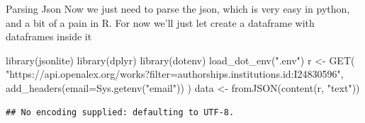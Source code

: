 \documentclass[
  10pt,
  ignorenonframetext,
  aspectratio=169]{beamer}
\newenvironment{Shaded}{\begin{snugshade}}{\end{snugshade}}
\newcommand{\AttributeTok}[1]{\textcolor[rgb]{0.80,0.80,0.80}{#1}}
\newcommand{\FunctionTok}[1]{\textcolor[rgb]{0.94,0.94,0.56}{#1}}
\newcommand{\NormalTok}[1]{\textcolor[rgb]{0.80,0.80,0.80}{#1}}
\newcommand{\OtherTok}[1]{\textcolor[rgb]{0.94,0.94,0.56}{#1}}
\newcommand{\SpecialCharTok}[1]{\textcolor[rgb]{0.86,0.64,0.64}{#1}}
\newcommand{\StringTok}[1]{\textcolor[rgb]{0.80,0.58,0.58}{#1}}
\begin{document}
\begin{frame}[fragile]{Parsing Json}
\protect\hypertarget{parsing-json-1}{}
Now we just need to parse the json, which is very easy in python, and a
bit of a pain in R. For now we'll just let create a dataframe with
dataframes inside it

\scriptsize

\begin{Shaded}
\begin{Highlighting}[]
\FunctionTok{library}\NormalTok{(jsonlite)}
\FunctionTok{library}\NormalTok{(dplyr)}
\FunctionTok{library}\NormalTok{(dotenv)}
\FunctionTok{load\_dot\_env}\NormalTok{(}\StringTok{".env"}\NormalTok{)}
\NormalTok{r }\OtherTok{\textless{}{-}} \FunctionTok{GET}\NormalTok{(}
  \StringTok{"https://api.openalex.org/works?filter=authorships.institutions.id:I24830596"}\NormalTok{,}
  \FunctionTok{add\_headers}\NormalTok{(}\AttributeTok{email=}\FunctionTok{Sys.getenv}\NormalTok{(}\StringTok{"email"}\NormalTok{))}
\NormalTok{  )}
\NormalTok{data }\OtherTok{\textless{}{-}} \FunctionTok{fromJSON}\NormalTok{(}\FunctionTok{content}\NormalTok{(r, }\StringTok{"text"}\NormalTok{))}
\end{Highlighting}
\end{Shaded}

\begin{verbatim}
## No encoding supplied: defaulting to UTF-8.
\end{verbatim}

\begin{Shaded}
\end{Shaded}


\end{frame}
\end{document}
